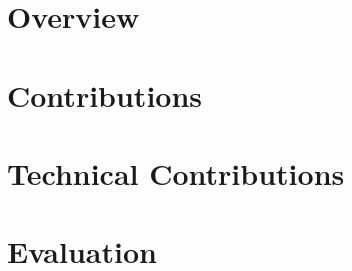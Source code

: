%
%
%
%

\part{Overview}
\label{part:overview}

\blinddocument

\part{Contributions}
\label{part:contributions}

\blinddocument

\part{Technical Contributions}
\label{part:techn-contr}

\blinddocument

\part{Evaluation}
\label{part:evaluation}

\blinddocument

